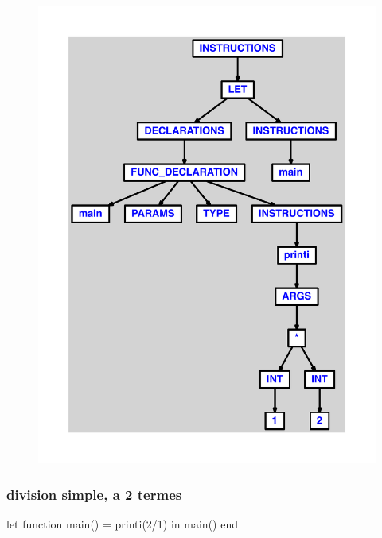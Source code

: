 \documentclass{article}
\begin{document}
\begin{figure}[H]\centering\includegraphics[max width=\textwidth]{ast/ast_41.pdf}\end{figure}\subsubsection{division simple, a 2 termes}
\begin{verbatimtab}
let
	function main() = printi(2/1)
in main() end
\end{verbatimtab}
\end{document}
